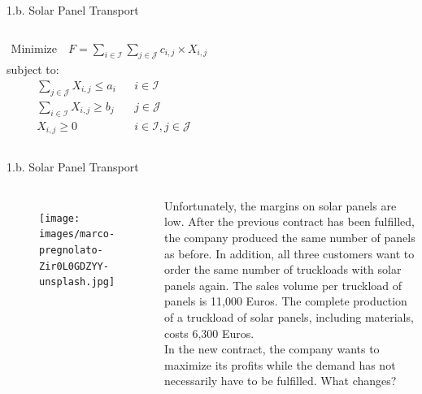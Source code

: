 \documentclass[aspectratio=1610,12pt]{beamer}
\begin{document}
\begin{frame}{1.b. Solar Panel Transport}
	\begin{columns}[onlytextwidth]
			\begin{align}
				\text{Minimize} \quad F = \sum_{i \in \mathcal{I}} \sum_{j \in \mathcal{J}} c_{i,j} \times X_{i,j}
			\end{align}
			subject to:
			\begin{align}
    			&\sum_{j \in \mathcal{J}} X_{i,j} \leq {a_i} && i \in \mathcal{I} \\
    			&\sum_{i \in \mathcal{I}} X_{i,j} \geq {b_j} && j \in \mathcal{J} \\
    			& X_{i,j}       \geq {0}     && i \in \mathcal{I}, j \in \mathcal{J}
			\end{align}
	\end{columns}
\end{frame}

\begin{frame}[fragile]{1.b. Solar Panel Transport}
	\begin{columns}[onlytextwidth]
    	\center
    		\begin{figure}
    			\texttt{[image: images/marco-pregnolato-Zir0L0GDZYY-unsplash.jpg]}
       		\end{figure}
    		Unfortunately, the margins on solar panels are low. After the previous contract has been fulfilled, the company produced the same number of panels as before. In addition, all three customers want to order the same number of truckloads with solar panels again. The sales volume per truckload of panels is 11,000 Euros. The complete production of a truckload of solar panels, including materials, costs 6,300 Euros.\\
    		
    		In the new contract, the company wants to maximize its profits while the demand has not necessarily have to be fulfilled. What changes?
    \end{columns}
\end{frame}
\end{document}

